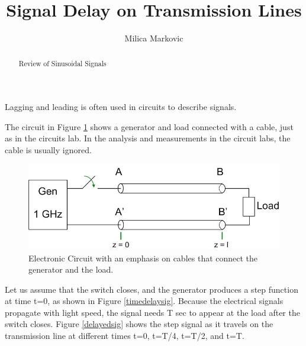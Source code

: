 \documentclass{ximera}
\title{Signal Delay on Transmission Lines}
\author{Milica Markovic}
\begin{document}
  
\begin{abstract}  
Review of Sinusoidal Signals
\end{abstract}  
\maketitle




Lagging and leading is often used in circuits to describe signals.

The circuit in Figure \ref{elcric} shows a generator and load connected with a cable, just as in the circuits lab. In the analysis and measurements in the circuit labs, the cable is usually ignored. 



\begin{figure}[htbp]
\begin{center}
\includegraphics[scale=0.5]{jpg/generaltransmissionlinecircuit1.jpg}
\end{center}
\caption{Electronic Circuit with an emphasis on cables that connect the generator and the load.}
\label{elcric}
\end{figure}

Let us assume that the switch closes, and the generator produces a step function at time t=0, as shown in Figure  \ref{timedelaysig}. Because the electrical signals propagate with light speed, the signal needs T sec to appear at the load after the switch closes. Figure \ref{delayedsig} shows the step signal as it travels on the transmission line at different times t=0, t=T/4, t=T/2, and t=T.
\end{document}
